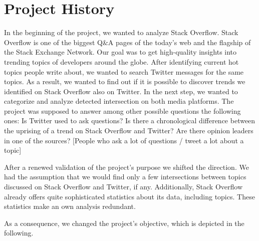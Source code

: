 
\chapter{Project History}
\label{cha:appendix}
In the beginning of the project, we wanted to analyze Stack Overflow. Stack Overflow is one of the biggest Q\&A pages of the today’s web and the flagship of the Stack Exchange Network.
Our goal was to get high-quality insights into trending topics of developers around the globe.
After identifying current hot topics people write about, we wanted to search Twitter messages for the same topics. As a result, we wanted to find out if it is possible to discover trends we identified on Stack Overflow also on Twitter. In the next step, we wanted to categorize and analyze detected intersection on both media platforms. The project was supposed to answer among other possible questions the following ones:
Is Twitter used to ask questions?
Is there a chronological difference between the uprising of a trend on Stack Overflow and Twitter?
Are there opinion leaders in one of the sources? [People who ask a lot of questions / tweet a lot about a topic]

After a renewed validation of the project’s purpose we shifted the direction. We had the assumption that we would find only a few intersections between topics discussed on Stack Overflow and Twitter, if any. Additionally, Stack Overflow already offers quite sophisticated statistics about its data, including topics. These statistics make an own analysis redundant.

As a consequence, we changed the project’s objective, which is depicted in the following.